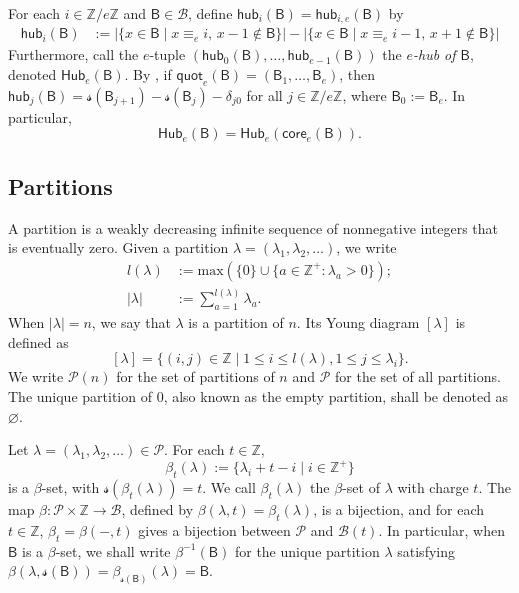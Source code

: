 \documentclass[11pt,a4paper,reqno]{amsart}
\numberwithin{equation}{section}
\theoremstyle{plain}
\theoremstyle{definition}
\newtheorem{Def}[thm]{Definition}
\theoremstyle{remark}
\numberwithin{equation}{section}
\newcommand{\fs}{\mathcal{s}}
\newcommand{\bfs}{\pmb{\fs}}
\newcommand{\core}{\mathsf{core}}
\newcommand{\quot}{\mathsf{quot}}
\renewcommand{\max}{\mathrm{max}}
\newcommand{\ZZ}{\mathbb{Z}}
\newcommand{\BB}{\mathcal{B}}
\newcommand{\B}{\mathsf{B}}
\newcommand{\Hub}{\mathsf{Hub}}
\newcommand{\hub}{\mathsf{hub}}
\newcommand{\PP}{\mathcal{P}}
\newcommand{\len}{l}
\def\Z{{\mathbb Z}}
\begin{document}
For each $i \in \Z/e\Z$ and $\B \in \BB$, define $\hub_i(\B) = \hub_{i,e}(\B)$ by
\begin{align*}
\hub_i(\B) &:= |\{ x \in \B \mid x\equiv_e i,\, x-1 \notin \B \}| - |\{ x \in \B \mid x \equiv_e i-1,\, x+1 \notin \B \}|
\end{align*}
Furthermore, call the $e$-tuple $(\hub_0(\B), \dotsc, \hub_{e-1}(\B))$ the {\em $e$-hub of $\B$}, denoted $\Hub_e(\B)$.
%
By \cite[Lemma 2.1]{LQT}, if $\quot_e(\B) = (\B_1,\dotsc, \B_{e})$, then
$%
\hub_j(\B) =
\fs(\B_{j+1}) - \fs(\B_{j}) - \delta_{j0} %
$ %
for all $j \in \ZZ/e\ZZ$,
where
$\B_0 := \B_e$.
In particular,
\begin{equation}
\Hub_e(\B) = \Hub_e(\core_e(\B)). \label{E:hub-core}
\end{equation}



\subsection{Partitions}
A partition is a weakly decreasing infinite sequence of nonnegative integers that is eventually zero.  Given a partition $\lambda = (\lambda_1,\lambda_2,\dotsc)$, we write \begin{align*}
\len(\lambda) &:= \max (\{ 0\} \cup \{ a \in \mathbb{Z}^+ : \lambda_a >0 \}) ; \\
|\lambda| &:= \sum_{a=1}^{\len(\lambda)} \lambda_a.
\end{align*}
When $|\lambda| = n$, we say that $\lambda$ is a partition of $n$.
Its Young diagram $[\lambda]$ is defined as
$$ [\lambda] = \{ (i,j) \in \mathbb{Z} \mid 1 \leq i \leq \len(\lambda), 1 \leq j \leq \lambda_i \}.
$$
We write $\PP(n)$ for the set of partitions of $n$ and $\PP$ for the set of all partitions.  The unique partition of $0$, also known as the empty partition, shall be denoted as $\varnothing$.

Let $\lambda = (\lambda_1,\lambda_2,\dotsc)\in \PP$. For each $t \in \mathbb{Z}$,
$$
\beta_t(\lambda) := \{ \lambda_i+t-i \mid i \in \mathbb{Z}^+\}
$$
is a $\beta$-set, with $\fs(\beta_t(\lambda)) = t$.  We call $\beta_t(\lambda)$ the $\beta$-set of $\lambda$ with charge $t$.
The map $\beta : \PP \times \ZZ \to \BB$, defined by $\beta(\lambda,t) = \beta_t(\lambda)$, is a bijection, and for each $t \in \mathbb{Z}$, $\beta_t = \beta(-,t)$ gives a bijection between $\PP$ and $\BB(t)$.  In particular, when $\B$ is a $\beta$-set, we shall write $\beta^{-1}(\B)$ for the unique partition $\lambda$ satisfying $\beta (\lambda, \fs(\B)) = \beta_{\fs(\B)}(\lambda) = \B$.
\end{document}
